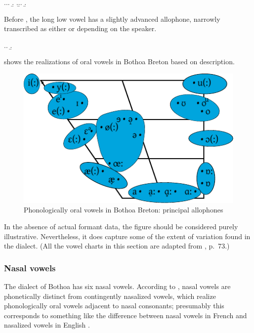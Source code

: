 \ex.\a.\a.
\b.
\z.\b.\a.
\b.

Before \ipa{[r]}, the long low vowel has a slightly advanced allophone, narrowly transcribed as either  or  depending on the speaker.

\ex.\a.
\b.

 shows the realizations of oral vowels in Bothoa Breton based on  description.\begin{figure}[htp]
  \centering
  \includegraphics[width=.8\textwidth]{graphics/vowelcharts/bothoa-oral-vowels}
    \caption{Phonologically oral vowels in Bothoa Breton: principal allophones}
  \label{fig:bothoa-oral-vowels}
\end{figure} In the absence of actual formant data, the figure should be considered purely illustrative. Nevertheless, it does capture some of the extent of variation found in the dialect. (All the vowel charts in this section are adapted from \citeauthor{humphreys95:_phonol_bothoa_saint_nicol_pelem} \cite*{humphreys95:_phonol_bothoa_saint_nicol_pelem}, p.~73.)

\subsubsection{Nasal vowels}
\label{sec:nasal-vowels}

The dialect of Bothoa has six nasal vowels. According to \citet{humphreys95:_phonol_bothoa_saint_nicol_pelem}, nasal vowels are phonetically distinct from contingently nasalized vowels, which realize phonologically oral vowels adjacent to nasal consonants; presumably this corresponds to something like the difference between nasal vowels in French and nasalized vowels in English \citep{cohn90:_phonet,cohn93:_nasal_englis}.

